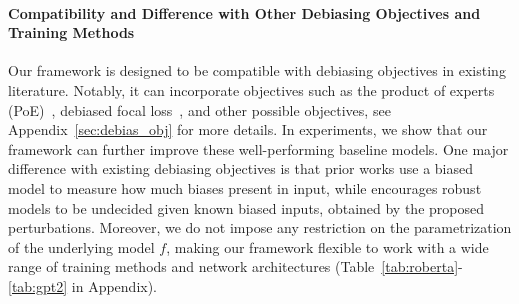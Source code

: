 


\paragraph{Compatibility and Difference with Other Debiasing Objectives and Training Methods} Our framework is designed to be %
compatible with debiasing objectives in existing literature. Notably, it can incorporate objectives such as the product of experts (PoE)~\citep{karimi-mahabadi-etal-2020-end,clark-etal-2019-dont}, debiased focal loss~\citep{karimi-mahabadi-etal-2020-end}, and other possible objectives, see Appendix~\ref{sec:debias_obj} for more details. In experiments, we show that our framework can further improve these well-performing baseline models. One major difference with existing debiasing objectives is that prior works use a biased model to measure how much biases present in input, while \OursCL encourages robust models to be undecided given known biased inputs, obtained by the proposed perturbations.
Moreover, we do not impose any restriction on the parametrization of the underlying model $f$, making our framework flexible to work with a wide range of training methods and network architectures (Table~\ref{tab:roberta}-\ref{tab:gpt2} in Appendix).

